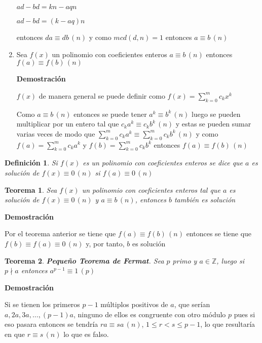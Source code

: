 \documentclass[a4paper,12pt]{report}
\newtheorem*{teo}{Teorema}
\newtheorem*{dfn}{Definición}
\begin{document}
\begin{enumerate}
 $ad-bd=kn-aqn$
 
 $ad-bd=(k-aq)n$
 
 entonces $da\equiv db \, (n)$ y como $mcd(d,n)=1$ entonces $a\equiv b\, (n)$
 
 \item Sea $f(x)$ un polinomio con coeficientes enteros $a \equiv b \, (n)$ entonces 
 $f(a) \equiv f(b) \, (n)$
 
  \textbf{Demostración}
  
  $f(x)$ de manera general se puede definir como $f(x)=\sum^{m}_{k=0}c_kx^k$
  
  Como $a \equiv b \, (n)$ entonces se puede tener $a^k \equiv b^k \, (n)$ luego se pueden multiplicar por un entero tal que $c_ka^k \equiv c_kb^k \, (n)$ y estas se pueden sumar varias veces de modo que $\sum^{m}_{k=0}c_ka^k \equiv \sum^{m}_{k=0}c_kb^k \, (n)$ y como $f(a)=\sum^{m}_{k=0}c_ka^k$ y $f(b)=\sum^{m}_{k=0}c_kb^k$ entonces $f(a)\equiv f(b) \, (n)$
  
  
\end{enumerate}

\begin{dfn}
 Si $f(x)$ es un polinomio con coeficientes enteros se dice que $a$ es solución de $f(x)\equiv 0 \, (n)$ si $f(a)\equiv 0 \, (n)$
\end{dfn}


\begin{teo}
 Sea $f(x)$ un polinomio con coeficientes enteros tal que $a$ es solución de  $f(x)\equiv 0 \, (n)$  y $a \equiv b \, (n)$, entonces $b$ también es solución
\end{teo}

\textbf{Demostración}

Por el teorema anterior se tiene que $f(a)\equiv f(b) \, (n)$ entonces se tiene que $f(b)\equiv f(a) \equiv 0\, (n)$ y, por tanto, $b$ es solución




\begin{teo}
 \textbf{Pequeño Teorema de Fermat}. Sea $p$ primo y $a\in\mathbb{Z}$, luego si $p\nmid a$ entonces $a^{p-1} \equiv 1 \, (p)$
\end{teo}

\textbf{Demostración}

Si se tienen los primeros $p-1$ múltiplos positivos de $a$, que serían $a,2a,3a,\dots,(p-1)a$, ninguno de ellos es congruente con otro módulo $p$ pues si eso pasara entonces se tendría $ra\equiv sa \, (n)$, $1\leq r < s \leq p-1$, lo que resultaría en que $r\equiv s \, (n)$ lo que es falso.
\end{document}
